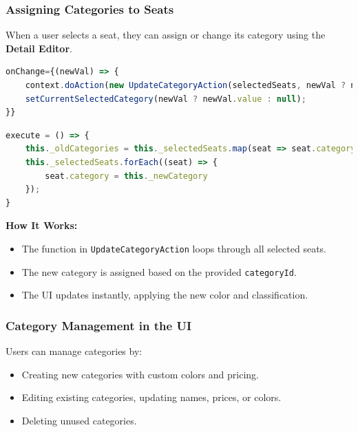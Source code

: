 \subsubsection{Assigning Categories to Seats}

When a user selects a seat, they can assign or change its category using the \textbf{Detail Editor}.

\begin{lstlisting}[language=TypeScript, caption=Assigning Categories to Selected Seats onChange, label=lst:assign-category]
onChange={(newVal) => {
    context.doAction(new UpdateCategoryAction(selectedSeats, newVal ? newVal.value : null))
    setCurrentSelectedCategory(newVal ? newVal.value : null);
}}
\end{lstlisting}

\begin{lstlisting}[language=TypeScript, caption=Assigning Categories to Selected Seats, label=lst:assign-category]
execute = () => {
    this._oldCategories = this._selectedSeats.map(seat => seat.category)
    this._selectedSeats.forEach((seat) => {
        seat.category = this._newCategory
    });
}
\end{lstlisting}

\textbf{How It Works:}
\begin{itemize}
    \item The function in \texttt{UpdateCategoryAction} loops through all selected seats.
    \item The new category is assigned based on the provided \texttt{categoryId}.
    \item The UI updates instantly, applying the new color and classification.
\end{itemize}

\subsubsection{Category Management in the UI}

Users can manage categories by:
\begin{itemize}
    \item Creating new categories with custom colors and pricing.
    \item Editing existing categories, updating names, prices, or colors.
    \item Deleting unused categories.
\end{itemize}

